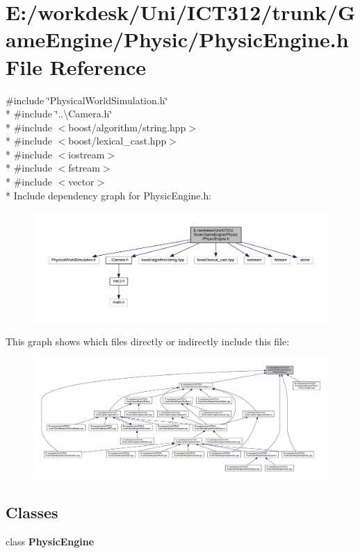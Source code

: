 \section{E\+:/workdesk/\+Uni/\+I\+C\+T312/trunk/\+Game\+Engine/\+Physic/\+Physic\+Engine.h File Reference}
\label{_physic_engine_8h}
{\ttfamily \#include \char`\"{}Physical\+World\+Simulation.\+h\char`\"{}}\\*
{\ttfamily \#include \char`\"{}..\textbackslash{}\+Camera.\+h\char`\"{}}\\*
{\ttfamily \#include $<$boost/algorithm/string.\+hpp$>$}\\*
{\ttfamily \#include $<$boost/lexical\+\_\+cast.\+hpp$>$}\\*
{\ttfamily \#include $<$iostream$>$}\\*
{\ttfamily \#include $<$fstream$>$}\\*
{\ttfamily \#include $<$vector$>$}\\*
Include dependency graph for Physic\+Engine.\+h\+:\nopagebreak
\begin{figure}[H]
\begin{center}
\leavevmode
\includegraphics[width=350pt]{da/dff/_physic_engine_8h__incl}
\end{center}
\end{figure}
This graph shows which files directly or indirectly include this file\+:
\nopagebreak
\begin{figure}[H]
\begin{center}
\leavevmode
\includegraphics[width=350pt]{d6/d74/_physic_engine_8h__dep__incl}
\end{center}
\end{figure}
\subsection*{Classes}
\begin{DoxyCompactItemize}
\item 
class {\bf Physic\+Engine}
\end{DoxyCompactItemize}
